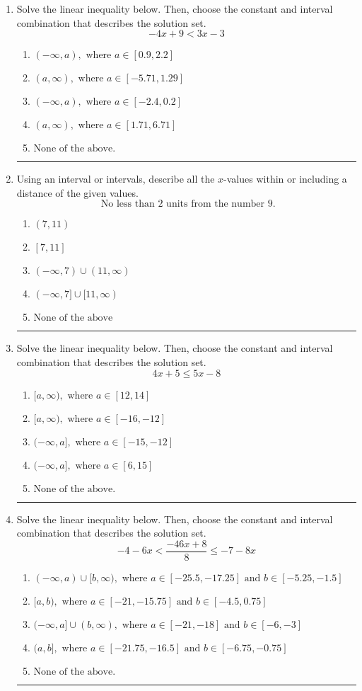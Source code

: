 \documentclass[14pt]{extbook}
\newcommand{\litem}[1]{\item#1\hspace*{-1cm}\rule{\textwidth}{0.4pt}}
\begin{document}
\begin{enumerate}
{\begin{enumerate}[label=\Alph*.]
\end{enumerate} }
\litem{
Solve the linear inequality below. Then, choose the constant and interval combination that describes the solution set.\[ -4x + 9 < 3x -3 \]\begin{enumerate}[label=\Alph*.]
\item \( (-\infty, a), \text{ where } a \in [0.9, 2.2] \)
\item \( (a, \infty), \text{ where } a \in [-5.71, 1.29] \)
\item \( (-\infty, a), \text{ where } a \in [-2.4, 0.2] \)
\item \( (a, \infty), \text{ where } a \in [1.71, 6.71] \)
\item \( \text{None of the above}. \)

\end{enumerate} }
\litem{
Using an interval or intervals, describe all the $x$-values within or including a distance of the given values.\[ \text{ No less than } 2 \text{ units from the number } 9. \]\begin{enumerate}[label=\Alph*.]
\item \( (7, 11) \)
\item \( [7, 11] \)
\item \( (-\infty, 7) \cup (11, \infty) \)
\item \( (-\infty, 7] \cup [11, \infty) \)
\item \( \text{None of the above} \)

\end{enumerate} }
\litem{
Solve the linear inequality below. Then, choose the constant and interval combination that describes the solution set.\[ 4x + 5 \leq 5x -8 \]\begin{enumerate}[label=\Alph*.]
\item \( [a, \infty), \text{ where } a \in [12, 14] \)
\item \( [a, \infty), \text{ where } a \in [-16, -12] \)
\item \( (-\infty, a], \text{ where } a \in [-15, -12] \)
\item \( (-\infty, a], \text{ where } a \in [6, 15] \)
\item \( \text{None of the above}. \)

\end{enumerate} }
\litem{
Solve the linear inequality below. Then, choose the constant and interval combination that describes the solution set.\[ -4 - 6 x < \frac{-46 x + 8}{8} \leq -7 - 8 x \]\begin{enumerate}[label=\Alph*.]
\item \( (-\infty, a) \cup [b, \infty), \text{ where } a \in [-25.5, -17.25] \text{ and } b \in [-5.25, -1.5] \)
\item \( [a, b), \text{ where } a \in [-21, -15.75] \text{ and } b \in [-4.5, 0.75] \)
\item \( (-\infty, a] \cup (b, \infty), \text{ where } a \in [-21, -18] \text{ and } b \in [-6, -3] \)
\item \( (a, b], \text{ where } a \in [-21.75, -16.5] \text{ and } b \in [-6.75, -0.75] \)
\item \( \text{None of the above.} \)


\end{enumerate}}
\end{enumerate}
\end{document}

